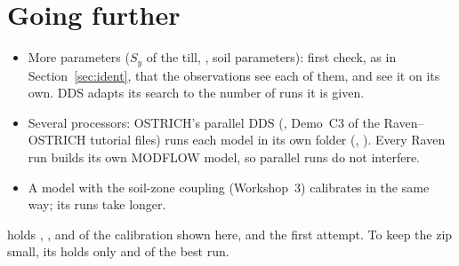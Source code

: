 \section{Going further}
\begin{itemize}
\item More parameters ($S_y$ of the till, , soil parameters): first check, as in
  Section~\ref{sec:ident}, that the observations see each of them, and see it on its own. DDS adapts its search to the
  number of runs it is given.
\item Several processors: OSTRICH's parallel DDS (, Demo~C3 of the Raven--OSTRICH tutorial files) runs
  each model in its own folder (, ). Every Raven run builds its own MODFLOW model, so
  parallel runs do not interfere.
\item A model with the soil-zone coupling (Workshop~3) calibrates in the same way; its runs take longer.
\end{itemize}
 holds , ,  and  of the
calibration shown here, and the first attempt. To keep the zip small, its  holds only  and
 of the best run.

